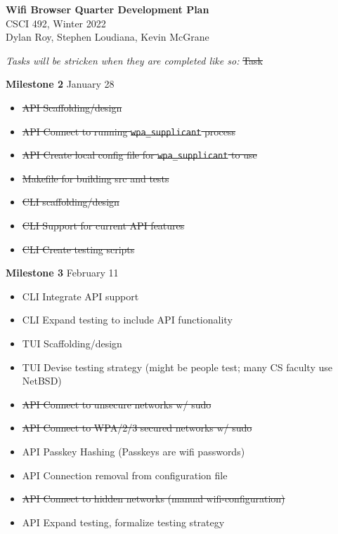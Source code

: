 \documentclass[11pt]{article}
\begin{document}
\begin{center}
  \textbf{\Large Wifi Browser Quarter Development Plan}\\\large CSCI 492, Winter 2022\\
  Dylan Roy, Stephen Loudiana, Kevin McGrane
\end{center}


\textit{Tasks will be stricken when they are completed like so:} \sout{Task}

\textbf{Milestone 2} January 28
\begin{itemize}
  \item\sout{API Scaffolding/design}
  \item\sout{API Connect to running \texttt{wpa\_supplicant} process}
  \item\sout{API Create local config file for \texttt{wpa\_supplicant} to use}
  \item\sout{Makefile for building src and tests}
  \item\sout{CLI scaffolding/design}
  \item\sout{CLI Support for current API features}
  \item\sout{CLI Create testing scripts}
\end{itemize}

\textbf{Milestone 3} February 11
\begin{itemize}
  \item CLI Integrate API support
  \item CLI Expand testing to include API functionality
  \item TUI Scaffolding/design
  \item TUI Devise testing strategy (might be people test; many CS faculty use NetBSD)
  \item\sout{API Connect to unsecure networks w/ sudo}
  \item\sout{API Connect to WPA/2/3 secured networks w/ sudo}
  \item API Passkey Hashing (Passkeys are wifi passwords)
  \item API Connection removal from configuration file
  \item\sout{API Connect to hidden networks (manual wifi-configuration)}
  \item API Expand testing, formalize testing strategy
\end{itemize}
\end{document}
